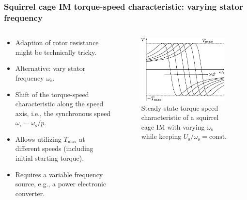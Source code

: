 \begin{frame}
	\frametitle{Squirrel cage IM torque-speed characteristic: varying stator frequency}
    \begin{columns}
		\begin{column}{0.5\textwidth}
	      \begin{itemize}
            \item<1-> Adaption of rotor resistance might be technically tricky.
            \item<2-> Alternative: vary stator frequency $\omega_\mathrm{s}$.
            \item<3-> Shift of the torque-speed characteristic along the speed axis, i.e., the synchronous speed $\omega_\mathrm{r}=\omega_\mathrm{s}/p$.
            \item<4-> Allows utilizing $T_\mathrm{max}$ at different speeds (including initial starting torque).
            \item<5-> Requires a variable frequency source, e.g., a power electronic converter.
          \end{itemize}
        \end{column}
        \begin{column}{0.5\textwidth}
            \begin{figure}
                \centering
                \includegraphics[width=0.95\textwidth]{fig/lec06/Kloss_formula_different_excitation_frequencies.pdf}
                \caption{Steady-state torque-speed characteristic of a squirrel cage IM with varying $\omega_\mathrm{s}$ while keeping $U_\mathrm{s}/\omega_\mathrm{s}=\mathrm{const.}$}
                \label{fig:Kloss_formula_different_excitation_frequencies}
            \end{figure}
        \end{column}
    \end{columns}
\end{frame}

